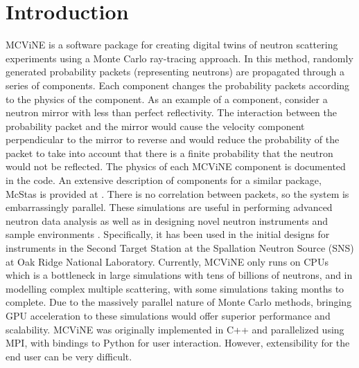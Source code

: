 

\section{Introduction}

MCViNE \cite{lin2016mcvine,Lin_2019} is a software package for creating digital twins of neutron scattering experiments using a Monte Carlo ray-tracing approach. 
In this method, randomly generated probability packets (representing neutrons) are propagated through a series of components. 
Each component changes the probability packets according to the physics of the component.
As an example of a component, consider a neutron mirror with less than perfect reflectivity. The interaction between the probability packet and the mirror would cause the velocity component perpendicular to the mirror to reverse and would reduce the probability of the packet to take into account that there is a finite probability that the neutron would not be reflected. The physics of each MCViNE component is documented in the code.
An extensive description of components for a similar package, McStas is provided at \cite{willendrup_components}.
There is no correlation between packets, so the system is embarrassingly parallel.
These simulations are useful in performing advanced neutron data analysis \cite{lin2022super,islam2019super,sala2022ferrimagnetic,do2022damped,leiner2019frustrated,lin2014UN} as well as in designing novel neutron instruments \cite{mamontov2022bwaves,an2022menus,sala2022chess,garlea2022verdi,leighton2022ewald,liu2022pioneer,qian2022centaur,changwoo2022expanse,ankner2023cinematic,hassina2023cupi2d,linjiao2023guide_misalignment} and sample environments \cite{stone2019design,niedziela2017design}. Specifically, it has been used in the initial designs for instruments in the Second Target Station at the Spallation Neutron Source (SNS) \cite{mason2006spallation} at Oak Ridge National Laboratory. 
Currently, MCViNE only runs on CPUs which is a bottleneck in large simulations with tens of billions of neutrons, and in modelling complex multiple scattering, with some simulations taking months to complete. Due to the massively parallel nature of Monte Carlo methods, bringing GPU acceleration to these simulations would offer superior performance and scalability. MCViNE was originally implemented in C++ and parallelized using MPI, with bindings to Python for user interaction. 
However, extensibility for the end user can be very difficult.

